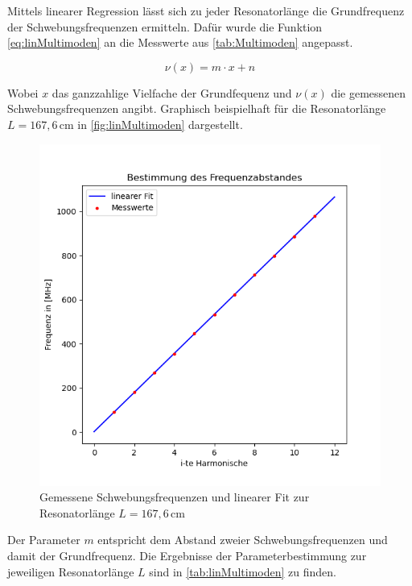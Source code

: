 Mittels linearer Regression lässt sich zu jeder Resonatorlänge die Grundfrequenz der Schwebungsfrequenzen ermitteln. Dafür wurde die Funktion \autoref{eq:linMultimoden} an die Messwerte aus \autoref{tab:Multimoden} angepasst. 

\begin{equation}
\nu (x) = m \cdot x + n
\label{eq:linMultimoden}
\end{equation}

Wobei $x$ das ganzzahlige Vielfache der Grundfequenz und $\nu (x)$ die gemessenen Schwebungsfrequenzen angibt. Graphisch beispielhaft für die Resonatorlänge $L = 167,6\,\text{cm}$ in \autoref{fig:linMultimoden} dargestellt.

\begin{figure}
\includegraphics{figures/Frequenzabstand.png}
\caption{Gemessene Schwebungsfrequenzen und linearer Fit zur Resonatorlänge $L = 167,6\,\text{cm}$}
\label{fig:linMultimoden}
\end{figure}

Der Parameter $m$ entspricht dem Abstand zweier Schwebungsfrequenzen und damit der Grundfrequenz. Die Ergebnisse der Parameterbestimmung zur jeweiligen Resonatorlänge $L$ sind in \autoref{tab:linMultimoden} zu finden.



